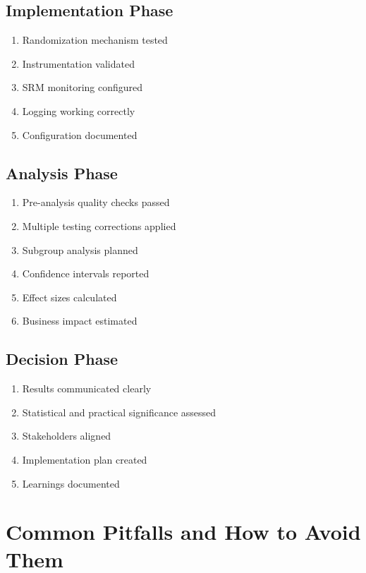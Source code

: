 \subsection{Implementation Phase}

\begin{enumerate}
    \item[$\square$] Randomization mechanism tested
    \item[$\square$] Instrumentation validated
    \item[$\square$] SRM monitoring configured
    \item[$\square$] Logging working correctly
    \item[$\square$] Configuration documented
\end{enumerate}

\subsection{Analysis Phase}

\begin{enumerate}
    \item[$\square$] Pre-analysis quality checks passed
    \item[$\square$] Multiple testing corrections applied
    \item[$\square$] Subgroup analysis planned
    \item[$\square$] Confidence intervals reported
    \item[$\square$] Effect sizes calculated
    \item[$\square$] Business impact estimated
\end{enumerate}

\subsection{Decision Phase}

\begin{enumerate}
    \item[$\square$] Results communicated clearly
    \item[$\square$] Statistical and practical significance assessed
    \item[$\square$] Stakeholders aligned
    \item[$\square$] Implementation plan created
    \item[$\square$] Learnings documented
\end{enumerate}

\section{Common Pitfalls and How to Avoid Them}

